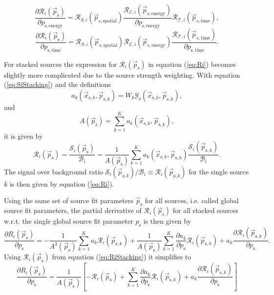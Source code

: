 \documentclass{article}
\newcommand{\ps}{\vec{p}_{\mathrm{s}}}
\newcommand{\psk}{\vec{p}_{\mathrm{s},k}}
\newcommand{\xsk}{\vec{x}_{\mathrm{s},k}}
\begin{document}
\begin{equation}
 \frac{\partial \mathcal{R}_i(\ps)}{\partial p_{\mathrm{s,energy}}} = \mathcal{R}_{S,i}(\vec{p}_{s,\mathrm{spatial}}) \frac{\mathcal{R}_{\mathcal{E},i}(\vec{p}_{s,\mathrm{energy}})}{\partial p_{\mathrm{s,energy}}} \mathcal{R}_{\mathcal{T},i}(\vec{p}_{s,\mathrm{time}}),
\end{equation}
\begin{equation}
 \frac{\partial \mathcal{R}_i(\ps)}{\partial p_{\mathrm{s,time}}} = \mathcal{R}_{S,i}(\vec{p}_{s,\mathrm{spatial}}) \mathcal{R}_{\mathcal{E},i}(\vec{p}_{s,\mathrm{energy}}) \frac{\mathcal{R}_{\mathcal{T},i}(\vec{p}_{s,\mathrm{time}})}{\partial p_{\mathrm{s,time}}}.
\end{equation}

For stacked sources the expression for $\mathcal{R}_i(\ps)$ in equation (\ref{eq:Ri})
becomes slightly more complicated due to the source strength weighting.
With equation (\ref{eq:SiStacking}) and the definitions
\begin{equation}
 a_k(\xsk,\psk) = W_k\mathcal{Y}_{\mathrm{s}}(\xsk,\psk),
\end{equation}
and
\begin{equation}
 A(\ps) = \sum_{k=1}^{K} a_k(\xsk,\psk),
\end{equation}
it is given by
\begin{equation}
\mathcal{R}_i(\ps) = \frac{\mathcal{S}_i(\ps)}{\mathcal{B}_i} = \frac{1}{A(\ps)} \sum_{k=1}^{K} a_k(\xsk,\psk) \frac{\mathcal{S}_{i}(\psk)}{\mathcal{B}_{i}}.
\label{eq:RiStacking}
\end{equation}
The signal over background ratio $\mathcal{S}_{i}(\psk) / \mathcal{B}_{i} \equiv \mathcal{R}_{i}(\psk)$
for the single source $k$ is then given by equation (\ref{eq:Ri}).

Using the same set of source fit parameters $\ps$ for all sources, i.e. called
global source fit parameters, the partial derivative of $\mathcal{R}_i(\ps)$ for
all stacked sources w.r.t. the single global source fit parameter
$p_{\mathrm{s}}$ is then given by
\begin{equation}
 \frac{\partial R_i(\ps)}{\partial p_{\mathrm{s}}} = - \frac{1}{A^2(\ps)}\sum_{k=1}^{K} a_{k} \mathcal{R}_i(\psk) + \frac{1}{A(\ps)}\sum_{k=1}^{K}\frac{\partial a_{k}}{\partial p_{\mathrm{s}}}\mathcal{R}_i(\psk) + a_{k}\frac{\partial \mathcal{R}_i(\psk)}{\partial p_{\mathrm{s}}}.
\end{equation}
Using $\mathcal{R}_i(\ps)$ from equation (\ref{eq:RiStacking}) it simplifies to
\begin{equation}
 \frac{\partial R_i(\ps)}{\partial p_{\mathrm{s}}} = \frac{1}{A(\ps)}\left[ -\mathcal{R}_i(\ps) + \sum_{k=1}^{K} \frac{\partial a_{k}}{\partial p_{\mathrm{s}}}\mathcal{R}_i(\psk) + a_{k}\frac{\partial \mathcal{R}_i(\psk)}{\partial p_{\mathrm{s}}} \right]
 \label{eq:gradRi}
\end{equation}
\end{document}
